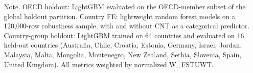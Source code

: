 \begin{table}[htp]
\centering
\small
\caption{Cross-context robustness: OECD-only holdout, country fixed-effects sensitivity, and country-group holdout evaluation\label{tab:country}}
\begin{tablenotes}
\item Note. OECD holdout: LightGBM evaluated on the OECD-member subset of the global holdout partition. Country FE: lightweight random forest models on a 120,000-row robustness sample, with and without CNT as a categorical predictor. Country-group holdout: LightGBM trained on 64 countries and evaluated on 16 held-out countries (Australia, Chile, Croatia, Estonia, Germany, Israel, Jordan, Malaysia, Malta, Mongolia, Montenegro, New Zealand, Serbia, Slovenia, Spain, United Kingdom). All metrics weighted by normalized W\_FSTUWT.
\end{tablenotes}
\end{table}
